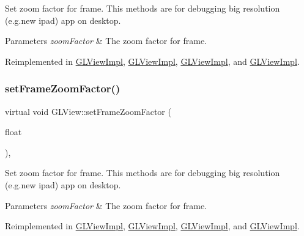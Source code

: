 Set zoom factor for frame. This methods are for debugging big resolution (e.\+g.\+new ipad) app on desktop.


\begin{DoxyParams}{Parameters}
{\em zoom\+Factor} & The zoom factor for frame. \\
\hline
\end{DoxyParams}


Reimplemented in \hyperlink{classGLViewImpl_a7db37b677458517eb4a2563bae912d1e}{G\+L\+View\+Impl}, \hyperlink{classGLViewImpl_a1fbfd81198efe1e87f725b2dfa53bab8}{G\+L\+View\+Impl}, \hyperlink{classGLViewImpl_aa8868ddca63e739ecfc2beeeaa61c1dd}{G\+L\+View\+Impl}, and \hyperlink{classGLViewImpl_aa8868ddca63e739ecfc2beeeaa61c1dd}{G\+L\+View\+Impl}.

\mbox{\label{classGLView_a1e9bc3b630d2225332656cf385ac7b2c}} 
\subsubsection{\texorpdfstring{set\+Frame\+Zoom\+Factor()}{setFrameZoomFactor()}\hspace{0.1cm}{\footnotesize\ttfamily [2/2]}}
{\footnotesize\ttfamily virtual void G\+L\+View\+::set\+Frame\+Zoom\+Factor (\begin{DoxyParamCaption}\item[{float}]{ }\end{DoxyParamCaption})\hspace{0.3cm}{\ttfamily [inline]}, {\ttfamily [virtual]}}

Set zoom factor for frame. This methods are for debugging big resolution (e.\+g.\+new ipad) app on desktop.


\begin{DoxyParams}{Parameters}
{\em zoom\+Factor} & The zoom factor for frame. \\
\hline
\end{DoxyParams}


Reimplemented in \hyperlink{classGLViewImpl_a7db37b677458517eb4a2563bae912d1e}{G\+L\+View\+Impl}, \hyperlink{classGLViewImpl_a1fbfd81198efe1e87f725b2dfa53bab8}{G\+L\+View\+Impl}, \hyperlink{classGLViewImpl_aa8868ddca63e739ecfc2beeeaa61c1dd}{G\+L\+View\+Impl}, and \hyperlink{classGLViewImpl_aa8868ddca63e739ecfc2beeeaa61c1dd}{G\+L\+View\+Impl}.

